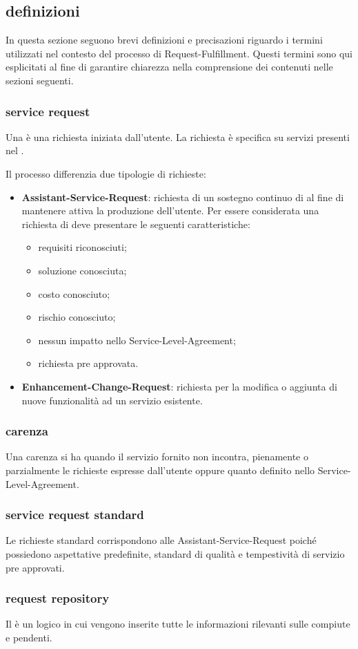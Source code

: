 \subsection[Definizioni]{definizioni}
\label{rf-introduction-definitions}
In questa sezione seguono brevi definizioni e precisazioni riguardo i termini utilizzati nel contesto del processo di \ac{Request-Fulfillment}. Questi termini sono qui esplicitati al fine di garantire chiarezza nella comprensione dei contenuti nelle sezioni seguenti.

\subsubsection{service request}
Una  è una richiesta iniziata dall'utente. La richiesta è specifica su servizi presenti nel .

Il processo differenzia due tipologie di richieste:

\begin{itemize}
\item{\textbf{\ac{Assistant-Service-Request}}: richiesta di un sostegno continuo di  al fine di mantenere attiva la produzione dell'utente. Per essere considerata una richiesta di  deve presentare le seguenti caratteristiche:}
\begin{itemize}
\item{requisiti riconosciuti;}
\item{soluzione conosciuta;}
\item{costo conosciuto;}
\item{rischio conosciuto;}
\item{nessun impatto nello \ac{Service-Level-Agreement};}
\item{richiesta pre approvata.}
\end{itemize}
\item{\textbf{\ac{Enhancement-Change-Request}}: richiesta per la modifica o aggiunta di nuove funzionalità ad un servizio esistente.}
\end{itemize}

\subsubsection{carenza}
Una carenza si ha quando il servizio fornito non incontra, pienamente o parzialmente le richieste espresse dall'utente oppure quanto definito nello \ac{Service-Level-Agreement}.

\subsubsection{service request standard}
Le richieste standard corrispondono alle \ac{Assistant-Service-Request} poiché possiedono aspettative predefinite, standard di qualità e tempestività di servizio pre approvati.

\subsubsection{request repository}
Il  è un  logico in cui vengono inserite tutte le informazioni rilevanti sulle  compiute e pendenti.